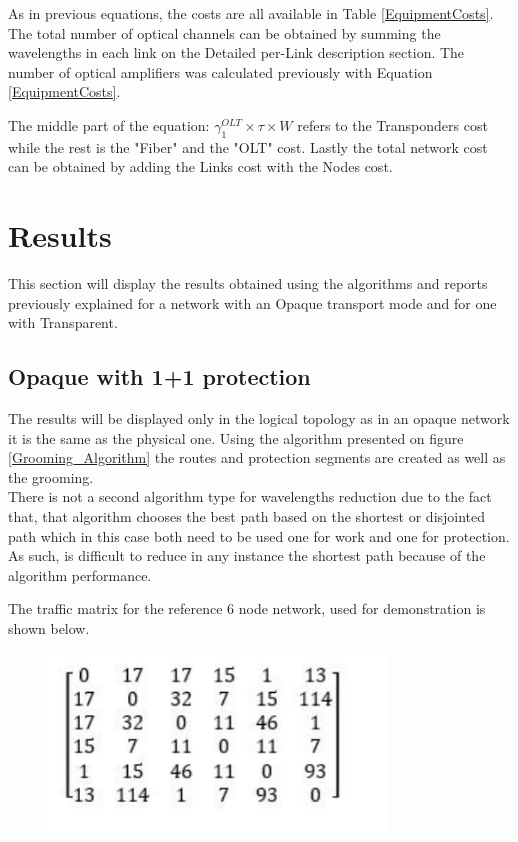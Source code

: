 	As in previous equations, the costs are all available in Table \ref{EquipmentCosts}. The total number of optical channels can be obtained by summing the wavelengths in each link on the Detailed per-Link description section. The number of optical amplifiers was calculated previously with Equation \ref{EquipmentCosts}.
	
	The middle part of the equation: $\gamma_1^{OLT} \times \tau \times W$ refers to the Transponders cost while the rest is the "Fiber" and the "OLT" cost.	Lastly the total network cost can be obtained by adding the Links cost with the Nodes cost.\\
	
	\section{Results}
	This section will display the results obtained using the algorithms and reports previously explained for a network with an Opaque transport mode and for one with Transparent.

	
	\subsection{Opaque with 1+1 protection}
	
	The results will be displayed only in the logical topology as in an opaque network it is the same as the physical one.
	Using the algorithm presented on figure \ref{Grooming_Algorithm} the routes and protection segments are created as well as the grooming. \\
	
	There is not a second algorithm type for wavelengths reduction due to the fact that, that algorithm chooses the best path based on the shortest or disjointed path which in this case both need to be used one for work and one for protection. As such, is difficult to reduce in any instance the shortest path because of the algorithm performance.
	
	The traffic matrix for the reference 6 node network, used for demonstration is shown below.
	
	\begin{figure}[h!]
		\centering
		\includegraphics[width=9cm]{opaqueLineMatricesLogical11.pdf}	
		\caption{}
		\label{opaqueLineMatricesLogical11}								
	\end{figure}	
	
